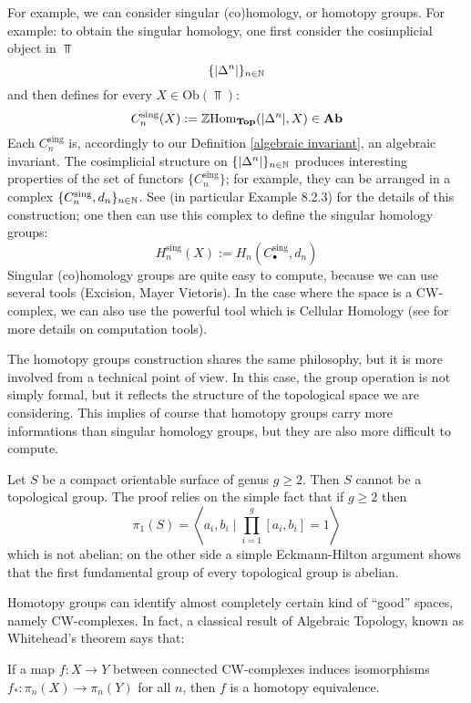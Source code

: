 \begin{refsection}
For example, we can consider singular (co)homology, or homotopy groups. For example: to obtain the singular homology, one first consider the cosimplicial object in $\Top$
\[
\{|\Delta^n|\}_{n \in \mathbb{N}}
\]
and then defines for every $X \in \mathrm{Ob}(\Top)$:
\[
C_n^{\mathrm{sing}}(X) := \mathbb{Z} \mathrm{Hom}_{\mathbf{Top}}(|\Delta^n|,X) \in \mathbf{Ab}
\]
Each $C_n^{\mathrm{sing}}$ is, accordingly to our Definition \ref{algebraic invariant}, an algebraic invariant. The cosimplicial structure on $\{|\Delta^n|\}_{n \in \mathbb{N}}$ produces interesting properties of the set of functors $\{C_n^{\mathrm{sing}}\}$; for example, they can be arranged in a complex $\{C_n^{\mathrm{sing}},d_n\}_{n \in \mathbb{N}}$. See \cite[Ch. 8.2]{weibel} (in particular Example 8.2.3) for the details of this construction; one then can use this complex to define the singular homology groups:
\[
H_n^{\mathrm{sing}}(X) := H_n(C_\bullet^{\mathrm{sing}},d_n)
\]
Singular (co)homology groups are quite easy to compute, because we can use several tools (Excision, Mayer Vietoris). In the case where the space is a CW-complex, we can also use the powerful tool which is Cellular Homology (see \cite[Ch. 2.2]{hatcher} for more details on computation tools).

The homotopy groups construction shares the same philosophy, but it is more involved from a technical point of view. In this case, the group operation is not simply formal, but it reflects the structure of the topological space we are considering. This implies of course that homotopy groups carry more informations than singular homology groups, but they are also more difficult to compute.

\begin{eg}
Let $S$ be a compact orientable surface of genus $g \ge 2$. Then $S$ cannot be a topological group. The proof relies on the simple fact that if $g \ge 2$ then
\[
\pi_1(S) = \left\langle a_i,b_i \mid \prod_{i = 1}^g [a_i,b_i] = 1 \right\rangle
\]
which is not abelian; on the other side a simple Eckmann-Hilton argument shows that the first fundamental group of every topological group is abelian.
\end{eg}

Homotopy groups can identify almost completely certain kind of ``good'' spaces, namely CW-complexes. In fact, a classical result of Algebraic Topology, known as Whitehead's theorem says that:

\begin{thm} \label{thm concrete whitehead}
If a map $f \colon X \to Y$ between connected CW-complexes induces isomorphisms $f_* \colon \pi_n(X) \to \pi_n(Y)$ for all $n$, then $f$ is a homotopy equivalence.
\end{thm}


\end{refsection}
